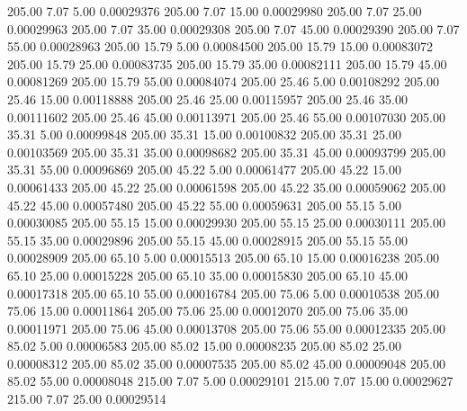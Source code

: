     205.00      7.07      5.00     0.00029376
    205.00      7.07     15.00     0.00029980
    205.00      7.07     25.00     0.00029963
    205.00      7.07     35.00     0.00029308
    205.00      7.07     45.00     0.00029390
    205.00      7.07     55.00     0.00028963
    205.00     15.79      5.00     0.00084500
    205.00     15.79     15.00     0.00083072
    205.00     15.79     25.00     0.00083735
    205.00     15.79     35.00     0.00082111
    205.00     15.79     45.00     0.00081269
    205.00     15.79     55.00     0.00084074
    205.00     25.46      5.00     0.00108292
    205.00     25.46     15.00     0.00118888
    205.00     25.46     25.00     0.00115957
    205.00     25.46     35.00     0.00111602
    205.00     25.46     45.00     0.00113971
    205.00     25.46     55.00     0.00107030
    205.00     35.31      5.00     0.00099848
    205.00     35.31     15.00     0.00100832
    205.00     35.31     25.00     0.00103569
    205.00     35.31     35.00     0.00098682
    205.00     35.31     45.00     0.00093799
    205.00     35.31     55.00     0.00096869
    205.00     45.22      5.00     0.00061477
    205.00     45.22     15.00     0.00061433
    205.00     45.22     25.00     0.00061598
    205.00     45.22     35.00     0.00059062
    205.00     45.22     45.00     0.00057480
    205.00     45.22     55.00     0.00059631
    205.00     55.15      5.00     0.00030085
    205.00     55.15     15.00     0.00029930
    205.00     55.15     25.00     0.00030111
    205.00     55.15     35.00     0.00029896
    205.00     55.15     45.00     0.00028915
    205.00     55.15     55.00     0.00028909
    205.00     65.10      5.00     0.00015513
    205.00     65.10     15.00     0.00016238
    205.00     65.10     25.00     0.00015228
    205.00     65.10     35.00     0.00015830
    205.00     65.10     45.00     0.00017318
    205.00     65.10     55.00     0.00016784
    205.00     75.06      5.00     0.00010538
    205.00     75.06     15.00     0.00011864
    205.00     75.06     25.00     0.00012070
    205.00     75.06     35.00     0.00011971
    205.00     75.06     45.00     0.00013708
    205.00     75.06     55.00     0.00012335
    205.00     85.02      5.00     0.00006583
    205.00     85.02     15.00     0.00008235
    205.00     85.02     25.00     0.00008312
    205.00     85.02     35.00     0.00007535
    205.00     85.02     45.00     0.00009048
    205.00     85.02     55.00     0.00008048
    215.00      7.07      5.00     0.00029101
    215.00      7.07     15.00     0.00029627
    215.00      7.07     25.00     0.00029514
